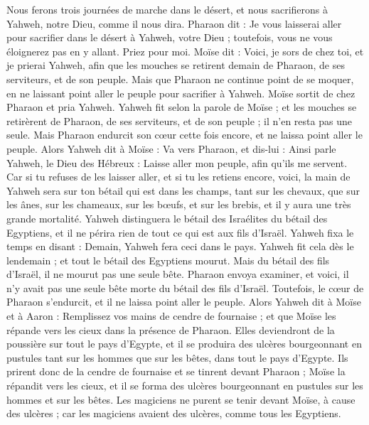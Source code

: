 \begin{multicols}{2}
Nous ferons trois journées de marche dans le désert, et nous sacrifierons à Yahweh, notre Dieu, comme il nous dira.
Pharaon dit : Je vous laisserai aller pour sacrifier dans le désert à Yahweh, votre Dieu ; toutefois, vous ne vous éloignerez pas en y allant. Priez pour moi.
Moïse dit : Voici, je sors de chez toi, et je prierai Yahweh, afin que les mouches se retirent demain de Pharaon, de ses serviteurs, et de son peuple. Mais que Pharaon ne continue point de se moquer, en ne laissant point aller le peuple pour sacrifier à Yahweh.
Moïse sortit de chez Pharaon et pria Yahweh.
Yahweh fit selon la parole de Moïse ; et les mouches se retirèrent de Pharaon, de ses serviteurs, et de son peuple ; il n’en resta pas une seule.
Mais Pharaon endurcit son cœur cette fois encore, et ne laissa point aller le peuple.
\VerseOne{}Alors Yahweh dit à Moïse : Va vers Pharaon, et dis-lui : Ainsi parle Yahweh, le Dieu des Hébreux : Laisse aller mon peuple, afin qu'ils me servent.
Car si tu refuses de les laisser aller, et si tu les retiens encore,
voici, la main de Yahweh sera sur ton bétail qui est dans les champs, tant sur les chevaux, que sur les ânes, sur les chameaux, sur les bœufs, et sur les brebis, et il y aura une très grande mortalité.
Yahweh distinguera le bétail des Israélites du bétail des Egyptiens, et il ne périra rien de tout ce qui est aux fils d'Israël.
Yahweh fixa le temps en disant : Demain, Yahweh fera ceci dans le pays.
Yahweh fit cela dès le lendemain ; et tout le bétail des Egyptiens mourut. Mais du bétail des fils d'Israël, il ne mourut pas une seule bête.
Pharaon envoya examiner, et voici, il n'y avait pas une seule bête morte du bétail des fils d'Israël. Toutefois, le cœur de Pharaon s'endurcit, et il ne laissa point aller le peuple.
Alors Yahweh dit à Moïse et à Aaron : Remplissez vos mains de cendre de fournaise ; et que Moïse les répande vers les cieux dans la présence de Pharaon.
Elles deviendront de la poussière sur tout le pays d'Egypte, et il se produira des ulcères bourgeonnant en pustules tant sur les hommes que sur les bêtes, dans tout le pays d'Egypte.
Ils prirent donc de la cendre de fournaise et se tinrent devant Pharaon ; Moïse la répandit vers les cieux, et il se forma des ulcères bourgeonnant en pustules sur les hommes et sur les bêtes.
Les magiciens ne purent se tenir devant Moïse, à cause des ulcères ; car les magiciens avaient des ulcères, comme tous les Egyptiens.

\end{multicols}
